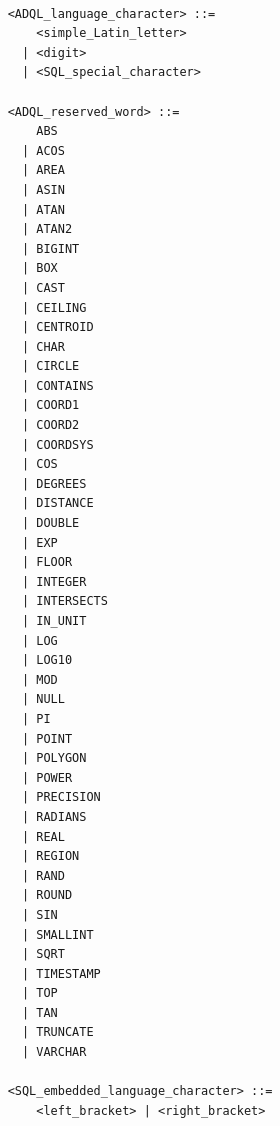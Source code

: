 \documentclass[11pt,a4paper]{ivoa}
\begin{document}
\begin{verbatim}

    <ADQL_language_character> ::=
        <simple_Latin_letter>
      | <digit>
      | <SQL_special_character>

    <ADQL_reserved_word> ::=
        ABS
      | ACOS
      | AREA
      | ASIN
      | ATAN
      | ATAN2
      | BIGINT
      | BOX
      | CAST
      | CEILING
      | CENTROID
      | CHAR
      | CIRCLE
      | CONTAINS
      | COORD1
      | COORD2
      | COORDSYS
      | COS
      | DEGREES
      | DISTANCE
      | DOUBLE
      | EXP
      | FLOOR
      | INTEGER
      | INTERSECTS
      | IN_UNIT
      | LOG
      | LOG10
      | MOD
      | NULL
      | PI
      | POINT
      | POLYGON
      | POWER
      | PRECISION
      | RADIANS
      | REAL
      | REGION
      | RAND
      | ROUND
      | SIN
      | SMALLINT
      | SQRT
      | TIMESTAMP
      | TOP
      | TAN
      | TRUNCATE
      | VARCHAR

    <SQL_embedded_language_character> ::=
        <left_bracket> | <right_bracket>


\end{verbatim}
\end{document}
